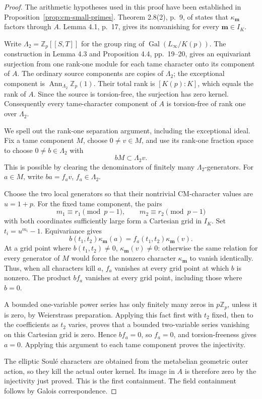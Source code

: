 \begin{proof}
The arithmetic hypotheses used in this proof have been
established in Proposition~\ref{prop:cm-small-primes}.
Theorem 2.8(2), p.~9, of \cite{Ishii} states that
\(\kappa_{\boldsymbol m}\) factors through \(A\).
Lemma 4.1, p.~17, gives its nonvanishing for every
\(\boldsymbol m\in I_K\).

Write \(\Lambda_2=\mathbb Z_p[[S,T]]\) for the group ring
of \(\operatorname{Gal}(L_\infty/K(p))\). The construction
in Lemma 4.3 and Proposition 4.4, pp.~19--20, gives an
equivariant surjection from one rank-one module for each
tame character onto its component of \(A\). The ordinary
source components are copies of \(\Lambda_2\); the exceptional
component is \(\operatorname{Ann}_{\Lambda_2}\mathbb Z_p(1)\).
Their total rank is \([K(p):K]\), which equals the rank of \(A\).
Since the source is torsion-free, the surjection has zero
kernel. Consequently every tame-character component of \(A\)
is torsion-free of rank one over \(\Lambda_2\).

We spell out the rank-one separation argument, including the
exceptional ideal. Fix a tame component \(M\), choose
\(0\ne v\in M\), and use its rank-one fraction space to choose
\(0\ne b\in\Lambda_2\) with
\[
 bM\subset\Lambda_2v .
\]
This is possible by clearing the denominators of finitely
many \(\Lambda_2\)-generators. For \(a\in M\), write
\(ba=f_av\), \(f_a\in\Lambda_2\).

Choose the two local generators so that their nontrivial
CM-character values are \(u=1+p\). For the fixed tame
component, the pairs
\[
 m_1\equiv r_1\pmod{p-1},\qquad
 m_2\equiv r_2\pmod{p-1}
\]
with both coordinates sufficiently large form a Cartesian
grid in \(I_K\). Set \(t_i=u^{m_i}-1\).
Equivariance gives
\[
 b(t_1,t_2)\kappa_{\boldsymbol m}(a)
       =f_a(t_1,t_2)\kappa_{\boldsymbol m}(v).
\]
At a grid point where \(b(t_1,t_2)\ne0\),
\(\kappa_{\boldsymbol m}(v)\ne0\): otherwise the same relation
for every generator of \(M\) would force the nonzero character
\(\kappa_{\boldsymbol m}\) to vanish identically.
Thus, when all characters kill \(a\), \(f_a\) vanishes at
every grid point at which \(b\) is nonzero. The product
\(bf_a\) vanishes at every grid point, including those where
\(b=0\).

A bounded one-variable power series has only finitely many
zeros in \(p\mathbb Z_p\), unless it is zero, by Weierstrass
preparation. Applying this fact first with \(t_2\) fixed,
then to the coefficients as \(t_2\) varies, proves that a
bounded two-variable series vanishing on this Cartesian
grid is zero. Hence \(bf_a=0\), so \(f_a=0\), and
torsion-freeness gives \(a=0\). Applying this argument to
each tame component proves the injectivity.

The elliptic Soul\'e characters are obtained from the
metabelian geometric outer action, so they kill the actual
outer kernel. Its image in \(A\) is therefore zero by the
injectivity just proved. This is the first containment.
The field containment follows by Galois correspondence.
\end{proof}

